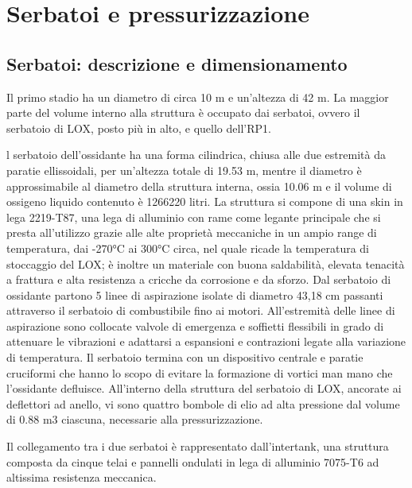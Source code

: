 \section{Serbatoi e pressurizzazione}
\label{sec:serbatoi e pressurizzazione}

\subsection{Serbatoi: descrizione e dimensionamento}
\label{subsec:Serbatoi:descrizione_e_dimensionamento}


Il primo stadio ha un diametro di circa 10 m e un’altezza di 42 m. La maggior parte del volume interno alla struttura è occupato dai serbatoi, ovvero il serbatoio di LOX, posto più in alto, e quello dell’RP1. 

l serbatoio dell’ossidante ha una forma cilindrica, chiusa alle due estremità da paratie ellissoidali, per un’altezza totale di 19.53 m, mentre il diametro è approssimabile al diametro della struttura interna, ossia 10.06 m e il volume di ossigeno liquido contenuto è 1266220 litri. 
La struttura si compone di una skin in lega 2219-T87, una lega di alluminio con rame come legante principale che si presta all’utilizzo grazie alle alte proprietà meccaniche in un ampio range di temperatura, dai -270°C ai 300°C circa, nel quale ricade la temperatura di stoccaggio del LOX; è inoltre un materiale con buona saldabilità, elevata tenacità a frattura e alta resistenza a cricche da corrosione e da sforzo. 
Dal serbatoio di ossidante partono 5 linee di aspirazione isolate di diametro 43,18 cm passanti attraverso il serbatoio di combustibile fino ai motori. All’estremità delle linee di aspirazione sono collocate valvole di emergenza e soffietti flessibili in grado di attenuare le vibrazioni e adattarsi a espansioni e contrazioni legate alla variazione di temperatura. 
Il serbatoio termina con un dispositivo centrale e paratie cruciformi che hanno lo scopo di evitare la formazione di vortici man mano che l’ossidante defluisce.
All’interno della struttura del serbatoio di LOX, ancorate ai deflettori ad anello, vi sono quattro bombole di elio ad alta pressione dal volume di 0.88 m3 ciascuna, necessarie alla pressurizzazione.

Il collegamento tra i due serbatoi è rappresentato dall’intertank, una struttura composta da cinque telai e pannelli ondulati in lega di alluminio 7075-T6 ad altissima resistenza meccanica.

